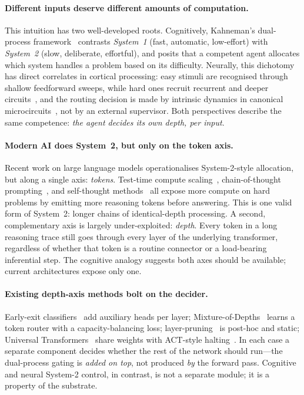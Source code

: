 \documentclass{article}
\begin{document}
\paragraph{Different inputs deserve different amounts of computation.}
This intuition has two well-developed roots. Cognitively, Kahneman's dual-process framework~\citep{kahneman2011thinking} contrasts \emph{System~1} (fast, automatic, low-effort) with \emph{System~2} (slow, deliberate, effortful), and posits that a competent agent allocates which system handles a problem based on its difficulty. Neurally, this dichotomy has direct correlates in cortical processing: easy stimuli are recognised through shallow feedforward sweeps, while hard ones recruit recurrent and deeper circuits~\citep{lamme2000distinct, kar2019recurrent, dicarlo2012does}, and the routing decision is made by intrinsic dynamics in canonical microcircuits~\citep{bastos2012canonical, buschman2007topdown}, not by an external supervisor. Both perspectives describe the same competence: \emph{the agent decides its own depth, per input}.

\paragraph{Modern AI does System~2, but only on the token axis.}
Recent work on large language models operationalises System-2-style allocation, but along a single axis: \emph{tokens}. Test-time compute scaling~\citep{openai2024o1, deepseek2025r1, snell2024scaling}, chain-of-thought prompting~\citep{wei2022chain}, and self-thought methods~\citep{zelikman2024quietstar} all expose more compute on hard problems by emitting more reasoning tokens before answering. This is one valid form of System~2: longer chains of identical-depth processing. A second, complementary axis is largely under-exploited: \emph{depth}. Every token in a long reasoning trace still goes through every layer of the underlying transformer, regardless of whether that token is a routine connector or a load-bearing inferential step. The cognitive analogy suggests both axes should be available; current architectures expose only one.

\paragraph{Existing depth-axis methods bolt on the decider.}
Early-exit classifiers~\citep{schuster2022confident, elbayad2020depth} add auxiliary heads per layer; Mixture-of-Depths~\citep{raposo2024mixture} learns a token router with a capacity-balancing loss; layer-pruning~\citep{gromov2024unreasonable, men2024shortgpt} is post-hoc and static; Universal Transformers~\citep{dehghani2018universal} share weights with ACT-style halting~\citep{graves2016adaptive}. In each case a separate component decides whether the rest of the network should run---the dual-process gating is \emph{added on top}, not produced \emph{by} the forward pass. Cognitive and neural System-2 control, in contrast, is not a separate module; it is a property of the substrate.
\end{document}
